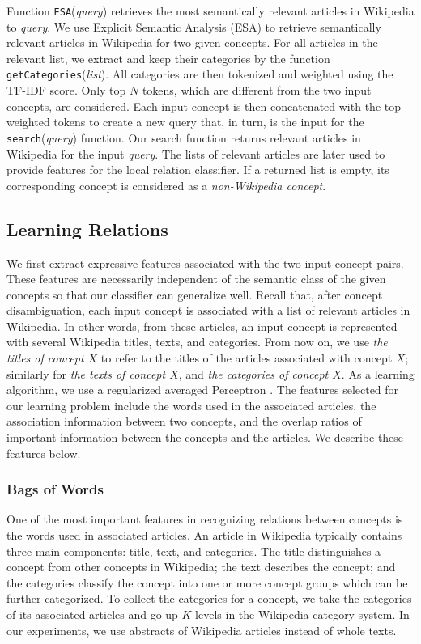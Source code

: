 Function \texttt{ESA}({\em query}) retrieves the most semantically
relevant articles in Wikipedia to {\em query}.  We use Explicit
Semantic Analysis (ESA) \cite{GabrilovichMa07} to retrieve
semantically relevant articles in Wikipedia for two given
concepts. For all articles in the relevant list, we extract and keep
their categories by the function \texttt{getCategories}({\em list}). All
categories are then tokenized and weighted using the TF-IDF
score. Only top $N$ tokens, which are different from the two input
concepts, are considered. Each input concept is then concatenated with
the top weighted tokens to create a new query that, in turn, is the
input for the \texttt{search}({\em query}) function. Our search
function returns relevant articles in Wikipedia for the input {\em
  query}. The lists of relevant articles are later used to provide
features for the local relation classifier. If a returned list is
empty, its corresponding concept is considered as a {\em non-Wikipedia
  concept}.

\subsection{Learning Relations}
\label{sec:learner}

We first extract expressive features associated with the two input
concept pairs. These features are necessarily independent of the
semantic class of the given concepts so that our classifier can
generalize well. Recall that, after concept disambiguation,
each input concept is associated with a list of relevant articles in
Wikipedia. In other words, from these articles, an input concept is
represented with several Wikipedia titles, texts, and categories. From
now on, we use {\em the titles of concept $X$} to refer to the titles
of the articles associated with concept $X$; similarly for {\em the
  texts of concept $X$}, and {\em the categories of concept $X$}. As a
learning algorithm, we use a regularized averaged Perceptron
\cite{FreundSc99}. The features selected for our learning problem
include the words used in the associated articles, the association
information between two concepts, and the overlap ratios of important
information between the concepts and the articles. We describe these
features below.

\subsubsection{Bags of Words}

One of the most important features in recognizing relations between
concepts is the words used in associated articles. An article in
Wikipedia typically contains three main components: title, text, and
categories. The title distinguishes a concept from other concepts in
Wikipedia; the text describes the concept; and the categories classify
the concept into one or more concept groups which can be further
categorized. To collect the categories for a concept, we take the
categories of its associated articles and go up $K$ levels in the
Wikipedia category system. In our experiments, we use abstracts of
Wikipedia articles instead of whole texts.

